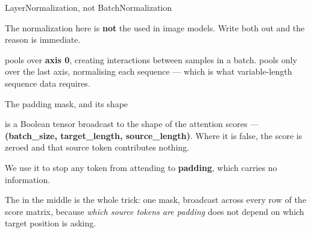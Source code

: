 \documentclass[aspectratio=169,11pt,t]{beamer}
\begin{document}
\begin{frame}[shrink=25]{LayerNormalization, not BatchNormalization}
{\fontsize{9.4}{12.6}\selectfont\color{fg2}The normalization here is \textbf{not} the  used in image models. Write both out and the reason is immediate.\par}\vskip 4pt
{\fontsize{9.4}{12.6}\selectfont\color{fg2} pools over \textbf{axis 0}, creating interactions between samples in a batch.  pools only over the last axis, normalising each sequence  --- which is what variable-length sequence data requires.\par}\vskip 4pt
\end{frame}

\begin{frame}[shrink=25]{The padding mask, and its shape}
{\fontsize{9.4}{12.6}\selectfont\color{fg2} is a Boolean tensor broadcast to the shape of the attention scores --- \textbf{(batch\_size, target\_length, source\_length)}. Where it is false, the score is zeroed and that source token contributes nothing.\par}\vskip 4pt
{\fontsize{9.4}{12.6}\selectfont\color{fg2}We use it to stop any token from attending to \textbf{padding}, which carries no information.\par}\vskip 4pt
{\fontsize{9.4}{12.6}\selectfont\color{fg2}The  in the middle is the whole trick: one mask, broadcast across every row of the score matrix, because \textit{which source tokens are padding} does not depend on which target position is asking.\par}\vskip 4pt
\end{frame}
\end{document}
